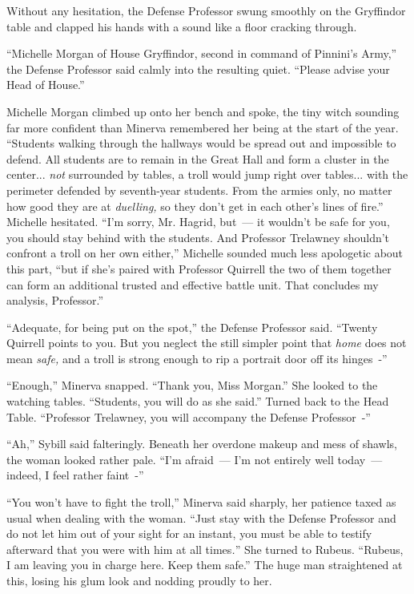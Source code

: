 Without any hesitation, the Defense Professor swung smoothly on the Gryffindor table and clapped his hands with a sound like a floor cracking through.

``Michelle Morgan of House Gryffindor, second in command of Pinnini's Army,'' the Defense Professor said calmly into the resulting quiet. ``Please advise your Head of House.''

Michelle Morgan climbed up onto her bench and spoke, the tiny witch sounding far more confident than Minerva remembered her being at the start of the year. ``Students walking through the hallways would be spread out and impossible to defend. All students are to remain in the Great Hall and form a cluster in the center... \emph{not} surrounded by tables, a troll would jump right over tables... with the perimeter defended by seventh-year students. From the armies only, no matter how good they are at \emph{duelling,} so they don't get in each other's lines of fire.'' Michelle hesitated. ``I'm sorry, Mr. Hagrid, but~--- it wouldn't be safe for you, you should stay behind with the students. And Professor Trelawney shouldn't confront a troll on her own either,'' Michelle sounded much less apologetic about this part, ``but if she's paired with Professor Quirrell the two of them together can form an additional trusted and effective battle unit. That concludes my analysis, Professor.''

``Adequate, for being put on the spot,'' the Defense Professor said. ``Twenty Quirrell points to you. But you neglect the still simpler point that \emph{home} does not mean \emph{safe,} and a troll is strong enough to rip a portrait door off its hinges~-''

``Enough,'' Minerva snapped. ``Thank you, Miss Morgan.'' She looked to the watching tables. ``Students, you will do as she said.'' Turned back to the Head Table. ``Professor Trelawney, you will accompany the Defense Professor~-''

``Ah,'' Sybill said falteringly. Beneath her overdone makeup and mess of shawls, the woman looked rather pale. ``I'm afraid~--- I'm not entirely well today~--- indeed, I feel rather faint~-''

``You won't have to fight the troll,'' Minerva said sharply, her patience taxed as usual when dealing with the woman. ``Just stay with the Defense Professor and do not let him out of your sight for an instant, you must be able to testify afterward that you were with him at all times\emph{.}'' She turned to Rubeus. ``Rubeus, I am leaving you in charge here. Keep them safe.'' The huge man straightened at this, losing his glum look and nodding proudly to her.

